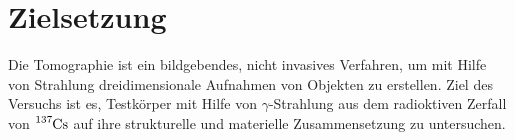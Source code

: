 \section{Zielsetzung}
\label{sec:zielsetzung}

Die Tomographie ist ein bildgebendes, nicht invasives Verfahren, um mit Hilfe
von Strahlung dreidimensionale Aufnahmen von Objekten zu erstellen.
Ziel des Versuchs ist es, Testkörper mit Hilfe von $\gamma$-Strahlung aus
dem radioktiven Zerfall von $\ce{^{137}Cs}$ auf ihre strukturelle und materielle
Zusammensetzung zu untersuchen.

